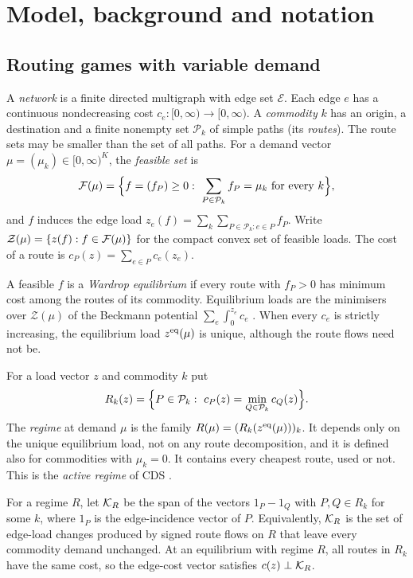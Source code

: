 \section{Model, background and notation}\label{sec:background}

\subsection{Routing games with variable demand}

A \emph{network} is a finite directed multigraph with edge set $\mathcal E$. Each edge $e$ has a continuous nondecreasing cost $c_e:[0,\infty)\to[0,\infty)$. A \emph{commodity} $k$ has an origin, a destination and a finite nonempty set $\mathcal P_k$ of simple paths (its \emph{routes}). The route sets may be smaller than the set of all paths. For a demand vector $\mu=(\mu_k)\in[0,\infty)^K$, the \emph{feasible set} is
\[
 \Fs(\mu)=\Bigl\{f=(f_{P})\ge0:\ \sum_{P\in\mathcal P_k}f_{P}=\mu_k\ \text{for every }k\Bigr\},
\]
and $f$ induces the edge load $z_e(f)=\sum_k\sum_{P\in\mathcal P_k\colon e\in P}f_P$. Write $\mathcal Z(\mu)=\{z(f):f\in\mathcal F(\mu)\}$ for the compact convex set of feasible loads. The cost of a route is $c_P(z)=\sum_{e\in P}c_e(z_e)$.

A feasible $f$ is a \emph{Wardrop equilibrium} if every route with $f_P>0$ has minimum cost among the routes of its commodity. Equilibrium loads are the minimisers over $\mathcal Z(\mu)$ of the Beckmann potential $\sum_e\int_0^{z_e}c_e$ \cite{BMW1956,Wardrop1952}. When every $c_e$ is strictly increasing, the equilibrium load $z^{\mathrm{eq}}(\mu)$ is unique, although the route flows need not be.

\begin{definition}\label{def:regime}
For a load vector $z$ and commodity $k$ put
\[
 R_k(z)=\Bigl\{P\in\mathcal P_k:\ c_P(z)=\min_{Q\in\mathcal P_k}c_Q(z)\Bigr\}.
\]
The \emph{regime} at demand $\mu$ is the family $R(\mu)=(R_k(z^{\mathrm{eq}}(\mu)))_k$. It depends only on the unique equilibrium load, not on any route decomposition, and it is defined also for commodities with $\mu_k=0$. It contains every cheapest route, used or not. This is the \emph{active regime} of CDS \cite[Definition~2.2]{CDS2024}.
\end{definition}

For a regime $R$, let $\mathcal K_R$ be the span of the vectors $1_P-1_Q$ with $P,Q\in R_k$ for some $k$, where $1_P$ is the edge-incidence vector of $P$. Equivalently, $\mathcal K_R$ is the set of edge-load changes produced by signed route flows on $R$ that leave every commodity demand unchanged. At an equilibrium with regime $R$, all routes in $R_k$ have the same cost, so the edge-cost vector satisfies $c(z)\perp\mathcal K_R$.

